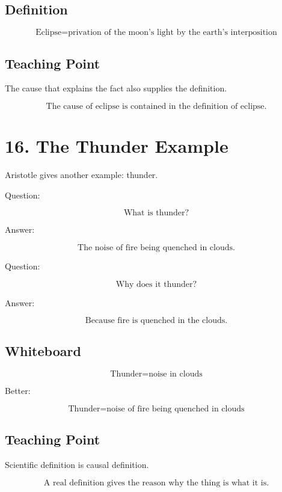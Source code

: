 \documentclass[12pt]{article}
\begin{document}
\subsection*{Definition}

\[
\text{Eclipse}
=
\text{privation of the moon's light by the earth's interposition}
\]

\subsection*{Teaching Point}

The cause that explains the fact also supplies the definition.

\[
\boxed{
\text{The cause of eclipse is contained in the definition of eclipse.}
}
\]

\section*{16. The Thunder Example}

Aristotle gives another example: thunder.

Question:

\[
\text{What is thunder?}
\]

Answer:

\[
\text{The noise of fire being quenched in clouds.}
\]

Question:

\[
\text{Why does it thunder?}
\]

Answer:

\[
\text{Because fire is quenched in the clouds.}
\]

\subsection*{Whiteboard}

\[
\text{Thunder} = \text{noise in clouds}
\]

Better:

\[
\boxed{
\text{Thunder} = \text{noise of fire being quenched in clouds}
}
\]

\subsection*{Teaching Point}

Scientific definition is causal definition.

\[
\boxed{
\text{A real definition gives the reason why the thing is what it is.}
}
\]
\end{document}
